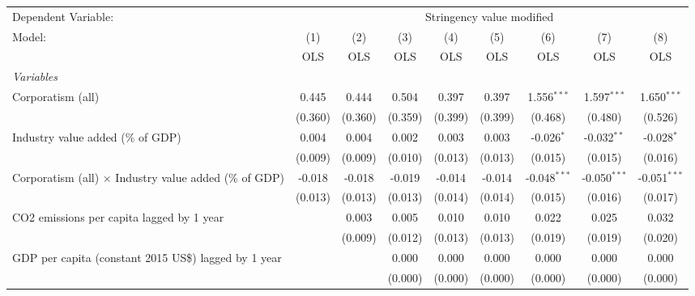 
\begingroup
\centering
\begin{tabular}{lcccccccc}
   \toprule
   Dependent Variable: & \multicolumn{8}{c}{Stringency value modified}\\
   Model:                                                        & (1)     & (2)     & (3)     & (4)     & (5)     & (6)            & (7)            & (8)\\  
                                                                 &  OLS    & OLS     & OLS     & OLS     & OLS     & OLS            & OLS            & OLS\\  
   \midrule
   \emph{Variables}\\
   Corporatism (all)                                             & 0.445   & 0.444   & 0.504   & 0.397   & 0.397   & 1.556$^{***}$  & 1.597$^{***}$  & 1.650$^{***}$\\   
                                                                 & (0.360) & (0.360) & (0.359) & (0.399) & (0.399) & (0.468)        & (0.480)        & (0.526)\\   
   Industry value added (\% of GDP)                              & 0.004   & 0.004   & 0.002   & 0.003   & 0.003   & -0.026$^{*}$   & -0.032$^{**}$  & -0.028$^{*}$\\   
                                                                 & (0.009) & (0.009) & (0.010) & (0.013) & (0.013) & (0.015)        & (0.015)        & (0.016)\\   
   Corporatism (all) $\times$ Industry value added (\% of GDP)   & -0.018  & -0.018  & -0.019  & -0.014  & -0.014  & -0.048$^{***}$ & -0.050$^{***}$ & -0.051$^{***}$\\   
                                                                 & (0.013) & (0.013) & (0.013) & (0.014) & (0.014) & (0.015)        & (0.016)        & (0.017)\\   
   CO2 emissions per capita lagged by 1 year                     &         & 0.003   & 0.005   & 0.010   & 0.010   & 0.022          & 0.025          & 0.032\\   
                                                                 &         & (0.009) & (0.012) & (0.013) & (0.013) & (0.019)        & (0.019)        & (0.020)\\   
   GDP per capita (constant 2015 US\$) lagged by 1 year          &         &         & 0.000   & 0.000   & 0.000   & 0.000          & 0.000          & 0.000\\   
                                                                 &         &         & (0.000) & (0.000) & (0.000) & (0.000)        & (0.000)        & (0.000)\\   

\end{tabular}
